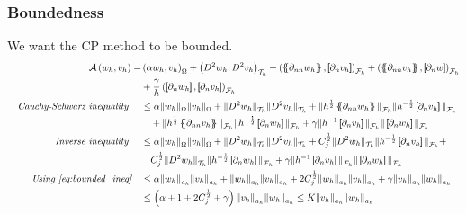 \subsubsection{Boundedness}%
\label{ssub:bounded}
We want the CP method to be bounded.
\begin{equation*}
    \begin{split}
\mathcal{A} \left( w_{h}, v_{h} \right)   =& \left( \alpha w_{h}, v_{h} \right) _{\Omega } +
    \left( D ^2 w_{h}, D ^2v_{h} \right) _{\mathcal{T} _{h}}
  +
  \left( \mean{  \partial _{n n} w_{h} }, \jump{ \partial _{n }v_{h}} \right)_{\mathcal{F}_{h}}  +
 \left( \mean{ \partial _{n n} v_{h} }, \jump{ \partial _{n}w }      \right)_{\mathcal{F}_{h}} \\
 & + \frac{\gamma }{h}  \left( \jump{ \partial _{n} w_{h}}, \jump{ \partial _{n} v_{h}   }   \right)_{\mathcal{F}_{h}} \\
\quad \textit{Cauchy-Schwarz inequality }\quad  &\le \alpha  \|  w_{h} \|_{\Omega   }^{  } \| v_{h} \|_{ \Omega  }^{  }     +
\| D ^2w_{h} \|_{\mathcal{T} _{h}   }^{  }  \| D ^2v_{h} \|_{\mathcal{T} _{h}   }^{  } + \| h^{\frac{1}{2}}\mean{ \partial _{nn} w_{h} } \|_{ \mathcal{F}_{h}  }^{  } \| h^{-\frac{1}{2}}\jump{ \partial _{n} v_{h} } \|_{ \mathcal{F}_{h}  }^{  }    \\
& \quad  + \| h^{\frac{1}{2}}\mean{ \partial _{nn} v_{h} }
\|_{ \mathcal{F}_{h}  }^{  } \| h^{-\frac{1}{2}}\jump{ \partial _{n} w_{h} } \|_{ \mathcal{F}_{h}  }^{  } + \gamma \| h^{-1} \jump{ \partial _{n} v_{h}}   \|_{ \mathcal{F} _{h} }^{  }   \|  \jump{ \partial _{n} w_{h}}   \|_{ \mathcal{F} _{h} }^{  } \\
\quad \textit{Inverse inequality }\quad  &\le \alpha  \|  w_{h} \|_{\Omega   }^{  } \| v_{h} \|_{ \Omega  }^{  }  +
\| D ^2w_{h} \|_{\mathcal{T} _{h}   }^{  }  \| D ^2v_{h} \|_{\mathcal{T} _{h}   }^{  } + C_{j}^{\frac{1}{2}} \| D ^2 w_{h} \|_{\mathcal{T} _{h}  }^{  }  \| h^{-\frac{1}{2}}\jump{ \partial _{n} v_{h} } \|_{ \mathcal{F}_{h}  }^{  }   +
 \\
& \quad  C_{j}^{\frac{1}{2}} \| D ^2 w_{h} \|_{\mathcal{T} _{h}  }^{  }
 \| h^{-\frac{1}{2}}\jump{ \partial _{n} w_{h} } \|_{ \mathcal{F}_{h}  }^{  } + \gamma \| h^{-1} \jump{ \partial _{n} v_{h}}   \|_{ \mathcal{F} _{h} }^{  }   \|  \jump{ \partial _{n} w_{h}}   \|_{ \mathcal{F} _{h} }^{  } \\
\textit{ Using \eqref{eq:bounded_ineq}}  \quad & \le\alpha  \|  w_{h} \|_{a_{h}   }^{  } \| v_{h} \|_{ a_{h}   }^{  } + \| w_{h} \|_{ a_{h} }^{  } \| v_{h} \|_{ a_{h} }^{  }  + 2C_{j}^{\frac{1}{2}} \| w_{h} \|_{ a_{h} }^{  } \| v_{h} \|_{ a_{h} }^{  } + \gamma \| v_{h} \|_{ a_{h} }^{  } \| w_{h} \|_{ a_{h} }^{  } \\
& \le  \left( \alpha + 1 + 2C_{j}^{\frac{1}{2}} + \gamma  \right)  \| v_{h} \|_{a_{h}  }^{  }  \| w_{h} \|_{ a_{h} }^{  }  \le  K  \| v_{h} \|_{a_{h}  }^{  }  \| w_{h} \|_{ a_{h} }^{  }
\end{split}
\end{equation*}

